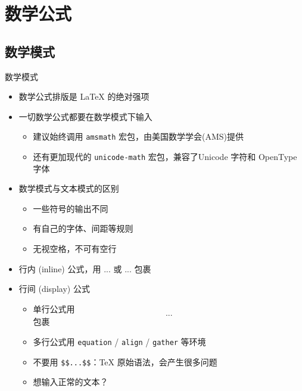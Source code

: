 \section{数学公式}

\subsection{数学模式}

\begin{frame}[fragile]{数学模式}
  \begin{itemize}
      \item 数学公式排版是 \LaTeX{} 的绝对强项
      \item 一切数学公式都要在数学模式下输入
      \begin{itemize}
          \item 建议始终调用 \texttt{amsmath} 宏包，由美国数学学会(AMS)提供
          \item 还有更加现代的 \texttt{unicode-math} 宏包，兼容了Unicode 字符和 OpenType 字体
      \end{itemize}
      \item 数学模式与文本模式的区别
      \begin{itemize}
          \item 一些符号的输出不同
          \item 有自己的字体、间距等规则
          \item 无视空格，不可有空行
      \end{itemize}
      \item 行内 (inline) 公式，用 \texttt{$...$} 或 \texttt{\(...\)} 包裹
      \item 行间 (display) 公式
      \begin{itemize}
          \item 单行公式用 \texttt{\[...\]} 包裹
          \item 多行公式用 \texttt{equation} / \texttt{align} / \texttt{gather} 等环境
          \item \alert{不要用 \texttt{\$\$...\$\$}}：\TeX{} 原始语法，会产生很多问题
          \item 想输入正常的文本？\texttt{}
      \end{itemize}
  \end{itemize}
\end{frame}
  
